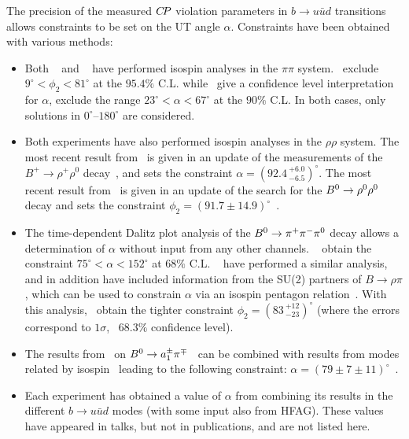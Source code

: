 The precision of the measured $C\!P$ violation parameters in
$b \to u\bar{u}d$ transitions allows 
constraints to be set on the UT angle $\alpha$. 
Constraints have been obtained with various methods:
\begin{itemize}\setlength{\itemsep}{0.5ex}
\item 
  Both \babar~\cite{Aubert:2007hh}
  and  \belle~\cite{Ishino:2006if} have performed 
  isospin analyses in the $\pi\pi$ system.
  \belle\ exclude $9^\circ < \phi_2 < 81^\circ$ at the $95.4\%$  C.L. while
  \babar\ give a confidence level interpretation for $\alpha$,
  exclude the range $23^\circ < \alpha < 67^\circ$ at the $90\%$  C.L.
  In both cases, only solutions in $0^\circ$--$180^\circ$ are considered.

\item
  Both experiments have also performed isospin analyses in the $\rho\rho$
  system. 
  The most recent result from \babar\ is given in an update of the
  measurements of the $B^+\to\rho^+\rho^0$ decay~\cite{Aubert:2009it}, and
  sets the constraint $\alpha = \left( 92.4 \,^{+6.0}_{-6.5}\right)^\circ$.
  The most recent result from \belle\ is given in an update of the
  search for the $B^0 \to \rho^0\rho^0$ decay and sets the constraint
  $\phi_2 = \left( 91.7 \pm 14.9 \right)^\circ$~\cite{:2008et}.

\item
  The time-dependent Dalitz plot analysis of the $B^0 \to \pi^+\pi^-\pi^0$
  decay allows a determination of $\alpha$ without input from any other 
  channels.
  \babar~\cite{Aubert:2007jn} obtain the constraint 
  $75^\circ < \alpha < 152^\circ$ at $68\%$ C.L.
  \belle~\cite{Kusaka:2007dv,:2007mj} have performed a similar analysis,
  and in addition have included information from the SU(2) partners of 
  $B \to \rho\pi$, which can be used to constrain $\alpha$
  via an isospin pentagon relation~\cite{Lipkin:1991st}. 
  With this analysis,
  \belle\ obtain the tighter constraint $\phi_2 = (83 \, ^{+12}_{-23})^\circ$
  (where the errors correspond to $1\sigma$, \ie\ $68.3\%$ confidence level).

\item 
  The results from \babar\ on $B^0 \to a_1^\pm \pi^\mp$~\cite{Aubert:2006gb} can be
  combined with results from modes related by isospin~\cite{Gronau:2005kw}
  leading to the following constraint: 
  $\alpha = \left( 79 \pm 7 \pm 11 \right)^\circ$~\cite{:2009ii}.

\item 
  Each experiment has obtained a value of $\alpha$ from combining its 
  results in the different $b \to u \bar{u} d$ modes 
  (with some input also from HFAG).
  These values have appeared in talks, but not in publications,
  and are not listed here.


\end{itemize}
